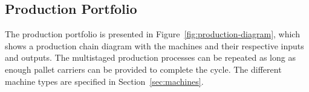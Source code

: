 \documentclass[12pt,twoside]{article}
\begin{document}
\subsection{Production Portfolio}
\label{sec:prodportfolio}

The production portfolio is presented in
Figure~\ref{fig:production-diagram}, which shows a production chain
diagram with the machines and their respective inputs and outputs. The
multistaged production processes can be repeated as long as enough
pallet carriers can be provided to complete the cycle. The different
machine types are specified in Section~\ref{sec:machines}.







  


\end{document}
